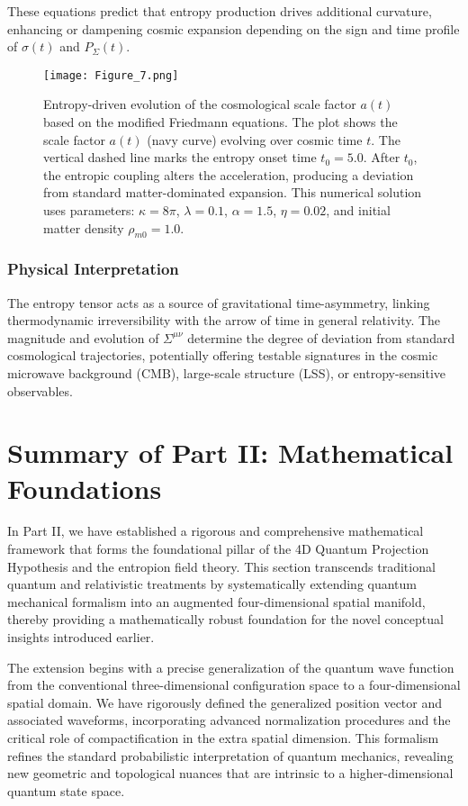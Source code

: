 \documentclass[12pt]{article}
\begin{document}
These equations predict that entropy production drives additional curvature, enhancing or dampening cosmic expansion depending on the sign and time profile of \( \sigma(t) \) and \( P_{\Sigma}(t) \).
\begin{figure}[htbp]
    \centering
    \texttt{[image: Figure\_7.png]}
    \caption{
        Entropy-driven evolution of the cosmological scale factor $a(t)$ based on the modified Friedmann equations.
        The plot shows the scale factor $a(t)$ (navy curve) evolving over cosmic time $t$.
        The vertical dashed line marks the entropy onset time $t_0 = 5.0$.
        After $t_0$, the entropic coupling alters the acceleration, producing a deviation from standard matter-dominated expansion.
        This numerical solution uses parameters: $\kappa = 8\pi$, $\lambda = 0.1$, $\alpha = 1.5$, $\eta = 0.02$, and initial matter density $\rho_{m0} = 1.0$.
    }
    \label{fig:entropy_scale_factor}
\end{figure}

\subsubsection*{Physical Interpretation}

The entropy tensor acts as a source of gravitational time-asymmetry, linking thermodynamic irreversibility with the arrow of time in general relativity. The magnitude and evolution of \( \Sigma^{\mu\nu} \) determine the degree of deviation from standard cosmological trajectories, potentially offering testable signatures in the cosmic microwave background (CMB), large-scale structure (LSS), or entropy-sensitive observables.

\section*{Summary of Part II: Mathematical Foundations}

In Part II, we have established a rigorous and comprehensive mathematical framework that forms the foundational pillar of the 4D Quantum Projection Hypothesis and the entropion field theory. This section transcends traditional quantum and relativistic treatments by systematically extending quantum mechanical formalism into an augmented four-dimensional spatial manifold, thereby providing a mathematically robust foundation for the novel conceptual insights introduced earlier.

The extension begins with a precise generalization of the quantum wave function from the conventional three-dimensional configuration space to a four-dimensional spatial domain. We have rigorously defined the generalized position vector and associated waveforms, incorporating advanced normalization procedures and the critical role of compactification in the extra spatial dimension. This formalism refines the standard probabilistic interpretation of quantum mechanics, revealing new geometric and topological nuances that are intrinsic to a higher-dimensional quantum state space.
\end{document}
